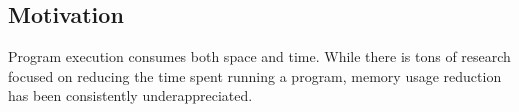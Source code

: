 



\subsection{Motivation}
Program execution consumes both space and time. While there is tons of research focused on reducing the time spent running a program, memory usage reduction has been consistently underappreciated.


